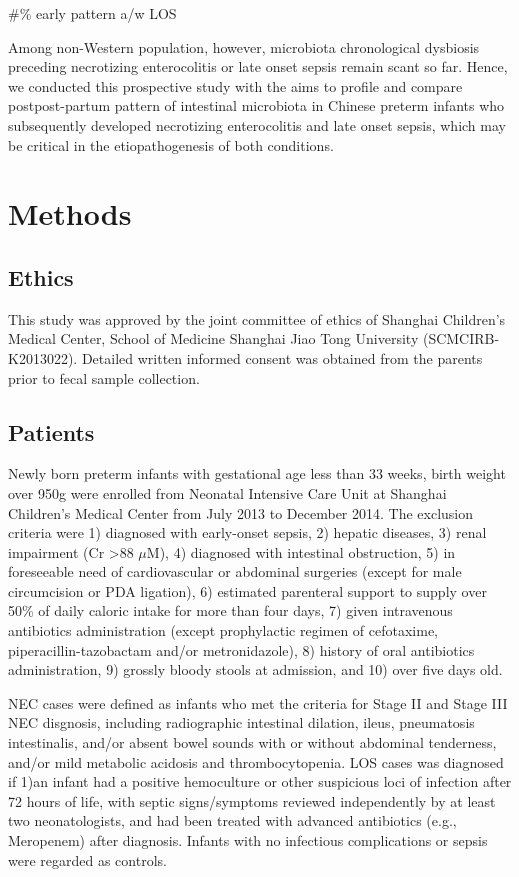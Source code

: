 \documentclass[fleqn,10pt,lineno]{wlpeerj} %
\begin{document}
\#\% early pattern a/w LOS


\noindent
 Among non-Western population, however, microbiota chronological dysbiosis preceding necrotizing enterocolitis or late onset sepsis remain scant so far. Hence, we conducted this prospective study with the aims to profile and compare postpost-partum pattern of intestinal microbiota in Chinese preterm infants who subsequently developed necrotizing enterocolitis and late onset sepsis, which may be critical in the etiopathogenesis of both conditions.

\section*{Methods}
  \subsection*{Ethics}
  This study was approved by the joint committee of ethics of Shanghai Children’s Medical Center, School of Medicine Shanghai Jiao Tong University (SCMCIRB-K2013022). Detailed written informed consent was obtained from the parents prior to fecal sample collection.

  \subsection*{Patients}
  Newly born preterm infants with gestational age less than 33 weeks, birth weight over 950g were enrolled from Neonatal Intensive Care Unit at Shanghai Children’s Medical Center from July 2013 to December 2014. The exclusion criteria were 1) diagnosed with early-onset sepsis, 2) hepatic diseases, 3) renal impairment (Cr \textgreater 88 $\mu$M), 4) diagnosed with intestinal obstruction, 5) in foreseeable need of cardiovascular or abdominal surgeries (except for male circumcision or PDA ligation), 6) estimated parenteral support to supply over 50\% of daily caloric intake for more than four days, 7) given intravenous antibiotics administration (except prophylactic regimen of cefotaxime, piperacillin-tazobactam and/or metronidazole), 8) history of oral antibiotics administration, 9) grossly bloody stools at admission, and 10) over five days old.

  \noindent
  NEC cases were defined as infants who met the criteria for Stage II and Stage III NEC disgnosis\citep{bell1978neonatal}, including radiographic intestinal dilation, ileus, pneumatosis intestinalis, and/or absent bowel sounds with or without abdominal tenderness, and/or mild metabolic acidosis and thrombocytopenia. LOS cases was diagnosed if 1)an infant had a positive hemoculture or other suspicious loci of infection after 72 hours of life, with septic signs/symptoms reviewed independently by at least two neonatologists, and had been treated with advanced antibiotics (e.g., Meropenem) after diagnosis. Infants with no infectious complications or sepsis were regarded as controls.
\end{document}
